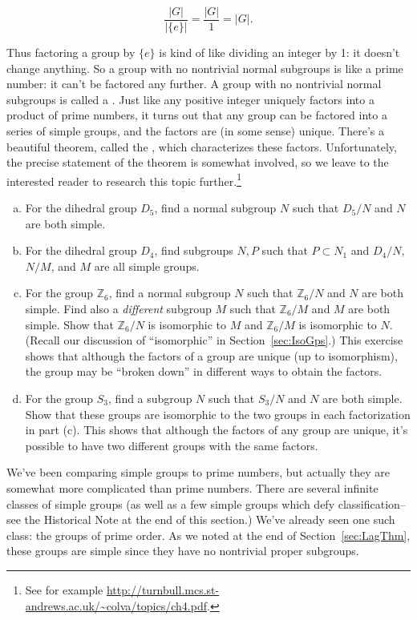 {\[ \frac{|G|}{|\{e\}|} = \frac{|G|}{1} = |G|. \]

\noindent
Thus factoring a group by $\{e\}$ is kind of like dividing an integer by 1: it doesn't change anything. So a group with no nontrivial normal subgroups is like a prime number: it can't be factored any further. A group with no nontrivial normal subgroups is called a .  Just like any positive integer uniquely factors into a product of prime numbers,  it turns out that any group can be factored into a series of simple groups, and the factors are (in some sense) unique.  There's a beautiful theorem, called the , which characterizes these factors. Unfortunately, the precise statement of the theorem is somewhat involved, so we leave to the interested reader to research this topic further.\footnote{See for example \url{http://turnbull.mcs.st-andrews.ac.uk/~colva/topics/ch4.pdf}.} 

\begin{exercise}{}
\begin{enumerate}[(a)]
\item
For the dihedral group $D_5$, find a normal subgroup $N$ such that $D_5 / N$ and $N$ are both simple.
\item
For the dihedral group $D_4$, find subgroups $N, P$ such that $P \subset N_1$ and  $D_4/N$, $N/M$, and $M$ are all  simple groups.
\item
For the  group $\mathbb{Z}_6$, find a normal subgroup $N$  such that $\mathbb{Z}_6 / N$ and $N$ are both simple. Find also a \emph{different} subgroup $M$  such that $\mathbb{Z}_6 / M$ and $M$ are both simple. Show that $\mathbb{Z}_6 / N$ is isomorphic to $M$ and $\mathbb{Z}_6 / M$ is isomorphic to $N$.  (Recall our discussion of ``isomorphic'' in Section~\ref{sec:IsoGps}.) This exercise shows that although the factors of a group are unique (up to isomorphism), the group may be ``broken down'' in different ways to obtain the factors.
\item
For the  group $S_3$, find a subgroup $N$  such that $S_3 / N$ and $N$ are both simple. Show that these groups are isomorphic to the two groups in each factorization in part (c).  This shows that although the factors of any group are unique, it's possible to have two different groups with the same factors.
\end{enumerate}
\end{exercise}

We've been comparing simple groups to prime numbers, but actually they are somewhat more complicated than prime numbers. There are several infinite classes of simple groups (as well as a few simple groups which defy classification--see the Historical Note at the end of this section.) We've already seen one such  class: the groups of prime order. As we noted at the end of Section~\ref{sec:LagThm}, these groups are simple since they have
no nontrivial proper subgroups. 


}
